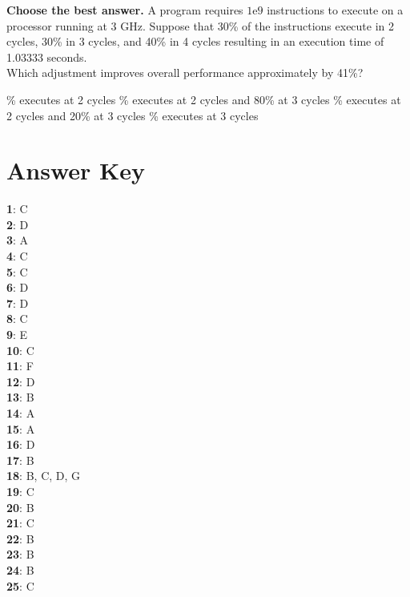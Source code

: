 \documentclass{exam}
\begin{document}
\begin{questions}
\question \textbf{Choose the best answer.}
        A program requires $1\mathrm{e}{9}$ instructions to execute on a processor running at 3 GHz. 
        Suppose that 30\% of the instructions execute in 2 cycles, 30\% in 3 cycles, and 40\% in 4 cycles 
        resulting in an execution time of 1.03333 seconds.
        \\
        Which adjustment improves overall performance approximately by 41\%?
        
		\begin{choices}
			\% executes at 2 cycles
			\% executes at 2 cycles and 80\% at 3 cycles
			\% executes at 2 cycles and 20\% at 3 cycles
			\% executes at 3 cycles
		\end{choices}%

\newpage
\section*{Answer Key}
    \textbf{1}: C \\
    \textbf{2}: D \\
    \textbf{3}: A \\
    \textbf{4}: C \\
    \textbf{5}: C \\
    \textbf{6}: D \\
    \textbf{7}: D \\
    \textbf{8}: C \\
    \textbf{9}: E \\
    \textbf{10}: C \\
    \textbf{11}: F \\
    \textbf{12}: D \\
    \textbf{13}: B \\
    \textbf{14}: A \\
    \textbf{15}: A \\
    \textbf{16}: D \\
    \textbf{17}: B \\
    \textbf{18}: B, C, D, G \\
    \textbf{19}: C \\
    \textbf{20}: B \\
    \textbf{21}: C \\
    \textbf{22}: B \\
    \textbf{23}: B \\
    \textbf{24}: B \\
    \textbf{25}: C \\
    
\end{questions}
\end{document}
